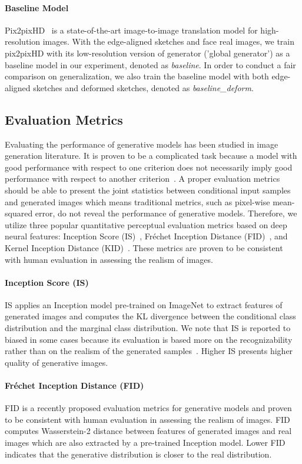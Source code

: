 \paragraph{Baseline Model} 
Pix2pixHD~\cite{pix2pixHD} is a state-of-the-art image-to-image translation model for high-resolution images. 
With the edge-aligned sketches and face real images, we train pix2pixHD with its low-resolution version of generator ('global generator') as a baseline model in our experiment, denoted as \textit{baseline}. 
In order to conduct a fair comparison on generalization, we also train the baseline model with both edge-aligned sketches and deformed sketches, denoted as \textit{baseline\_deform}.

\subsection{Evaluation Metrics} 
Evaluating the performance of generative models has been studied in image generation literature.
It is proven to be a complicated task because a model with good performance with respect to one criterion does not necessarily imply good performance with respect to another criterion~\cite{GANs_equal}. 
A proper evaluation metrics should be able to present the joint statistics between conditional input samples and generated images which means traditional metrics, such as pixel-wise mean-squared error, do not reveal the performance of generative models. 
Therefore, we utilize three popular quantitative perceptual evaluation metrics based on deep neural features: Inception Score (IS)~\cite{Improved_Techniques}, Fréchet Inception Distance (FID)~\cite{FID},
and Kernel Inception Distance (KID)~\cite{KID}. 
These metrics are proven to be consistent with human evaluation in assessing the realism of images.

\paragraph{Inception Score (IS)}
IS applies an Inception model pre-trained on ImageNet to extract features of generated images and computes the KL divergence between the conditional class distribution and the marginal class distribution. We note that IS is reported to biased in some cases because its evaluation is based more on the recognizability rather than on the realism of the generated samples~\cite{evaluation}. Higher IS presents higher quality of generative images.

\paragraph{Fréchet Inception Distance (FID)}
FID is a recently proposed evaluation metrics for generative models and proven to be consistent with human evaluation in assessing the realism of images. FID computes Wasserstein-2 distance between features of generated images and real images which are also extracted by a pre-trained Inception model. Lower FID indicates that the generative distribution is closer to the real distribution.


